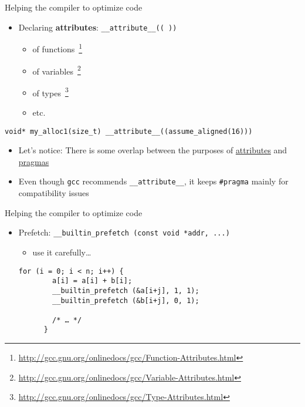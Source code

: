 \documentclass[10pt,xcolor=table]{beamer}
\begin{document}
\begin{frame}[fragile]{Helping the compiler to optimize code}

  \begin{itemize}
  \item Declaring {\bf attributes}: \hfil {\tt \_\_attribute\_\_(( ))}
    \begin{itemize}
    \item of functions~\footnote{\url{http://gcc.gnu.org/onlinedocs/gcc/Function-Attributes.html}}
    \item of variables~\footnote{\url{http://gcc.gnu.org/onlinedocs/gcc/Variable-Attributes.html}}
    \item of types~\footnote{\url{http://gcc.gnu.org/onlinedocs/gcc/Type-Attributes.html}}
    \item etc.
    \end{itemize}
  \end{itemize}

  \begin{lstlisting}[style=c,gobble=2,caption={Example: assume an
      aligned pointer is returned}]
    void* my_alloc1(size_t) __attribute__((assume_aligned(16)))
  \end{lstlisting}

  \pause

  \begin{itemize}
  \item Let's notice: There is some overlap between the purposes of
    \underline{attributes} and \underline{pragmas}
  \item Even though {\tt gcc} recommends {\tt \_\_attribute\_\_}, it
    keeps {\tt \#pragma} mainly for compatibility issues
  \end{itemize}


\end{frame}

\begin{frame}[fragile]{Helping the compiler to optimize code}

  \begin{itemize}
  \item Prefetch: {\footnotesize \tt \_\_builtin\_prefetch (const void
      *addr, ...)}
    \begin{itemize}
    \item use it carefully\ldots
    \end{itemize}

    \begin{lstlisting}[style=c,gobble=2,caption={Prefetching example}]
      for (i = 0; i < n; i++) {
        a[i] = a[i] + b[i];
        __builtin_prefetch (&a[i+j], 1, 1);
        __builtin_prefetch (&b[i+j], 0, 1);

        /* … */
      }
    \end{lstlisting}
  \end{itemize}

\end{frame}
\end{document}
